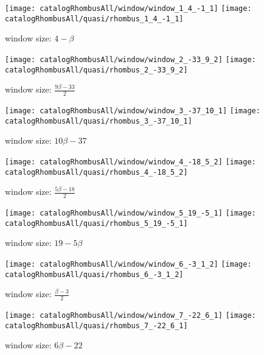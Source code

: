 \documentclass[text.tex]{subfiles}
\begin{document}
\pagestyle{empty}
\begin{landscape}
\begin{figure}[h!]
\centering
\texttt{[image: catalogRhombusAll/window/window\_1\_4\_-1\_1]}
\texttt{[image: catalogRhombusAll/quasi/rhombus\_1\_4\_-1\_1]}
\caption*{window size: $4-\beta$}
\end{figure}

\begin{figure}[h!]
\centering
\texttt{[image: catalogRhombusAll/window/window\_2\_-33\_9\_2]}
\texttt{[image: catalogRhombusAll/quasi/rhombus\_2\_-33\_9\_2]}
\caption*{window size: $\frac{9\beta-33}{2}$}
\end{figure}

\begin{figure}[h!]
\centering
\texttt{[image: catalogRhombusAll/window/window\_3\_-37\_10\_1]}
\texttt{[image: catalogRhombusAll/quasi/rhombus\_3\_-37\_10\_1]}
\caption*{window size: $10\beta-37$}
\end{figure}

\begin{figure}[h!]
\centering
\texttt{[image: catalogRhombusAll/window/window\_4\_-18\_5\_2]}
\texttt{[image: catalogRhombusAll/quasi/rhombus\_4\_-18\_5\_2]}
\caption*{window size: $\frac{5\beta-18}{2}$}
\end{figure}

\begin{figure}[h!]
\centering
\texttt{[image: catalogRhombusAll/window/window\_5\_19\_-5\_1]}
\texttt{[image: catalogRhombusAll/quasi/rhombus\_5\_19\_-5\_1]}
\caption*{window size: $19-5\beta$}
\end{figure}

\thispagestyle{empty}
\begin{figure}[h!]
\centering
\texttt{[image: catalogRhombusAll/window/window\_6\_-3\_1\_2]}
\texttt{[image: catalogRhombusAll/quasi/rhombus\_6\_-3\_1\_2]}
\caption*{window size: $\frac{\beta-3}{2}$}
\end{figure}

\begin{figure}[h!]
\centering
\texttt{[image: catalogRhombusAll/window/window\_7\_-22\_6\_1]}
\texttt{[image: catalogRhombusAll/quasi/rhombus\_7\_-22\_6\_1]}
\caption*{window size: $6\beta-22$}
\end{figure}


\end{landscape}
\end{document}
